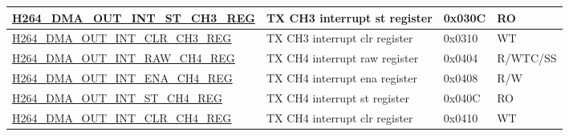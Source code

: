 \begin{longtable}{ | p{7.5cm} | p{5.7cm} | p{1.2cm} | p{1.5cm} | }
\hyperref[regdesc:H264DMAOUTINTSTCH3REG]{H264\_DMA\_OUT\_INT\_ST\_CH3\_REG} & TX CH3  interrupt st register & 0x030C & RO \\ \hline
\hyperref[regdesc:H264DMAOUTINTCLRCH3REG]{H264\_DMA\_OUT\_INT\_CLR\_CH3\_REG} & TX CH3  interrupt clr register & 0x0310 & WT \\ \hline
\hyperref[regdesc:H264DMAOUTINTRAWCH4REG]{H264\_DMA\_OUT\_INT\_RAW\_CH4\_REG} & TX CH4  interrupt raw register & 0x0404 & R/WTC/SS \\ \hline
\hyperref[regdesc:H264DMAOUTINTENACH4REG]{H264\_DMA\_OUT\_INT\_ENA\_CH4\_REG} & TX CH4  interrupt ena register & 0x0408 & R/W \\ \hline
\hyperref[regdesc:H264DMAOUTINTSTCH4REG]{H264\_DMA\_OUT\_INT\_ST\_CH4\_REG} & TX CH4  interrupt st register & 0x040C & RO \\ \hline
\hyperref[regdesc:H264DMAOUTINTCLRCH4REG]{H264\_DMA\_OUT\_INT\_CLR\_CH4\_REG} & TX CH4  interrupt clr register & 0x0410 & WT \\ \hline


\end{longtable}
